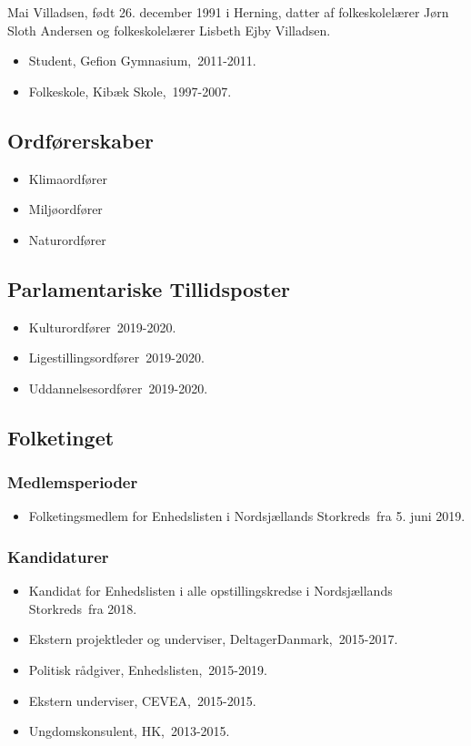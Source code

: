 \documentclass[11pt, a4paper]{awesome-cv}
\begin{document}
\makecvheader[R]
\makelettertitle
\begin{cvletter}
Mai Villadsen, født 26. december 1991 i Herning, datter af folkeskolelærer Jørn Sloth Andersen og folkeskolelærer Lisbeth Ejby Villadsen.

\begin{itemize}
\item Student, Gefion Gymnasium, 2011-2011.
\item Folkeskole, Kibæk Skole, 1997-2007.
\end{itemize}
\subsection*{Ordførerskaber}
\begin{itemize}
\item Klimaordfører
\item Miljøordfører
\item Naturordfører
\end{itemize}
\subsection*{Parlamentariske Tillidsposter}
\begin{itemize}
\item Kulturordfører 2019-2020.
\item Ligestillingsordfører 2019-2020.
\item Uddannelsesordfører 2019-2020.
\end{itemize}
\subsection*{Folketinget}
\subsubsection*{Medlemsperioder}
\begin{itemize}
\item Folketingsmedlem for Enhedslisten i Nordsjællands Storkreds fra 5. juni 2019.
\end{itemize}
\subsubsection*{Kandidaturer}
\begin{itemize}
\item Kandidat for Enhedslisten i alle opstillingskredse i Nordsjællands Storkreds fra 2018.
\end{itemize}
\begin{itemize}
\item Ekstern projektleder og underviser, DeltagerDanmark, 2015-2017.
\item Politisk rådgiver, Enhedslisten, 2015-2019.
\item Ekstern underviser, CEVEA, 2015-2015.
\item Ungdomskonsulent, HK, 2013-2015.
\end{itemize}
\end{cvletter}
\end{document}

